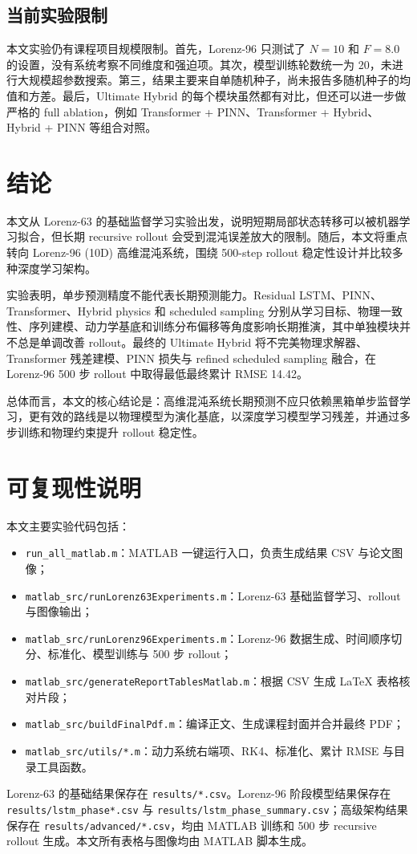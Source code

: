 \documentclass[UTF8,a4paper,12pt]{ctexart}
\begin{document}
\subsection{当前实验限制}

本文实验仍有课程项目规模限制。首先，Lorenz-96 只测试了 $N=10$ 和 $F=8.0$ 的设置，没有系统考察不同维度和强迫项。其次，模型训练轮数统一为 20，未进行大规模超参数搜索。第三，结果主要来自单随机种子，尚未报告多随机种子的均值和方差。最后，Ultimate Hybrid 的每个模块虽然都有对比，但还可以进一步做严格的 full ablation，例如 Transformer + PINN、Transformer + Hybrid、Hybrid + PINN 等组合对照。

\section{结论}

本文从 Lorenz-63 的基础监督学习实验出发，说明短期局部状态转移可以被机器学习拟合，但长期 recursive rollout 会受到混沌误差放大的限制。随后，本文将重点转向 Lorenz-96 (10D) 高维混沌系统，围绕 500-step rollout 稳定性设计并比较多种深度学习架构。

实验表明，单步预测精度不能代表长期预测能力。Residual LSTM、PINN、Transformer、Hybrid physics 和 scheduled sampling 分别从学习目标、物理一致性、序列建模、动力学基底和训练分布偏移等角度影响长期推演，其中单独模块并不总是单调改善 rollout。最终的 Ultimate Hybrid 将不完美物理求解器、Transformer 残差建模、PINN 损失与 refined scheduled sampling 融合，在 Lorenz-96 500 步 rollout 中取得最低最终累计 RMSE 14.42。

总体而言，本文的核心结论是：高维混沌系统长期预测不应只依赖黑箱单步监督学习，更有效的路线是以物理模型为演化基底，以深度学习模型学习残差，并通过多步训练和物理约束提升 rollout 稳定性。

\section{可复现性说明}

本文主要实验代码包括：
\begin{itemize}
    \item \texttt{run\_all\_matlab.m}：MATLAB 一键运行入口，负责生成结果 CSV 与论文图像；
    \item \texttt{matlab\_src/runLorenz63Experiments.m}：Lorenz-63 基础监督学习、rollout 与图像输出；
    \item \texttt{matlab\_src/runLorenz96Experiments.m}：Lorenz-96 数据生成、时间顺序切分、标准化、模型训练与 500 步 rollout；
    \item \texttt{matlab\_src/generateReportTablesMatlab.m}：根据 CSV 生成 LaTeX 表格核对片段；
    \item \texttt{matlab\_src/buildFinalPdf.m}：编译正文、生成课程封面并合并最终 PDF；
    \item \texttt{matlab\_src/utils/*.m}：动力系统右端项、RK4、标准化、累计 RMSE 与目录工具函数。
\end{itemize}
Lorenz-63 的基础结果保存在 \texttt{results/*.csv}。Lorenz-96 阶段模型结果保存在 \texttt{results/lstm\_phase*.csv} 与 \texttt{results/lstm\_phase\_summary.csv}；高级架构结果保存在 \texttt{results/advanced/*.csv}，均由 MATLAB 训练和 500 步 recursive rollout 生成。本文所有表格与图像均由 MATLAB 脚本生成。
\end{document}
